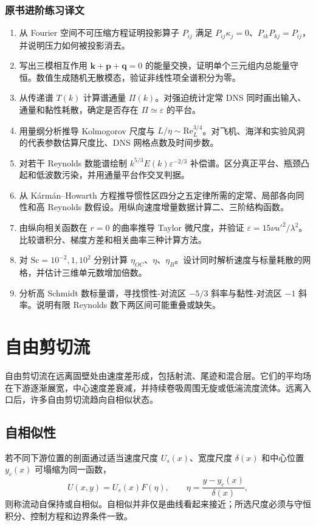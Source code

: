\documentclass[12pt,a4paper,openany,fontset=none]{ctexbook}
\newcommand{\Rey}{\mathrm{Re}}
\begin{document}
\subsection*{原书进阶练习译文}
\begin{enumerate}[label=\arabic*.]
 \item 从 Fourier 空间不可压缩方程证明投影算子 $P_{ij}$ 满足 $P_{ij}\kappa_j=0$、$P_{ik}P_{kj}=P_{ij}$，并说明压力如何被投影消去。
 \item 写出三模相互作用 $\bm k+\bm p+\bm q=0$ 的能量交换，证明单个三元组内总能量守恒。数值生成随机无散模态，验证非线性项全谱积分为零。
 \item 从传递谱 $T(k)$ 计算谱通量 $\Pi(k)$。对强迫统计定常 DNS 同时画出输入、通量和黏性耗散，确定是否存在 $\Pi\simeq\varepsilon$ 的平台。
 \item 用量纲分析推导 Kolmogorov 尺度与 $L/\eta\sim\Rey_L^{3/4}$。对飞机、海洋和实验风洞的代表参数估算尺度比、DNS 网格点数及时间步数。
 \item 对若干 Reynolds 数能谱绘制 $k^{5/3}E(k)\varepsilon^{-2/3}$ 补偿谱。区分真正平台、瓶颈凸起和低波数污染，并用通量平台作交叉判据。
 \item 从 K\'arm\'an--Howarth 方程推导惯性区四分之五定律所需的定常、局部各向同性和高 Reynolds 数假设。用纵向速度增量数据计算二、三阶结构函数。
 \item 由纵向相关函数在 $r=0$ 的曲率推导 Taylor 微尺度，并验证 $\varepsilon=15\nu u'^2/\lambda^2$。比较谱积分、梯度方差和相关曲率三种计算方法。
 \item 对 $\mathrm{Sc}=10^{-2},1,10^2$ 分别计算 $\eta_{OC}$、$\eta$、$\eta_B$。设计同时解析速度与标量耗散的网格，并估计三维单元数增加倍数。
 \item 分析高 Schmidt 数标量谱，寻找惯性-对流区 $-5/3$ 斜率与黏性-对流区 $-1$ 斜率。说明有限 Reynolds 数下两区间可能重叠或缺失。
\end{enumerate}
\chapter{自由剪切流}

自由剪切流在远离固壁处由速度差形成，包括射流、尾迹和混合层。它们的平均场在下游逐渐展宽，中心速度差衰减，并持续卷吸周围无旋或低湍流度流体。远离入口后，许多自由剪切流趋向自相似状态。

\section{自相似性}

若不同下游位置的剖面通过适当速度尺度 $U_s(x)$、宽度尺度 $\delta(x)$ 和中心位置 $y_c(x)$ 可塌缩为同一函数，
\begin{equation}
 U(x,y)=U_s(x)F\!\left(\eta\right),\qquad
 \eta=\frac{y-y_c(x)}{\delta(x)},
\end{equation}
则称流动自保持或自相似。自相似并非仅是曲线看起来接近；所选尺度必须与守恒积分、控制方程和边界条件一致。
\end{document}
